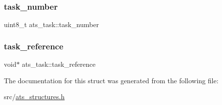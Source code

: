 \subsubsection{\texorpdfstring{task\+\_\+number}{task\_number}}
{\footnotesize\ttfamily uint8\+\_\+t ats\+\_\+task\+::task\+\_\+number}

\mbox{\label{structats__task_a058f0acf4bc87250302ff718710d5dbf}} 
\subsubsection{\texorpdfstring{task\+\_\+reference}{task\_reference}}
{\footnotesize\ttfamily void$\ast$ ats\+\_\+task\+::task\+\_\+reference}



The documentation for this struct was generated from the following file\+:\begin{DoxyCompactItemize}
\item 
src/\hyperlink{ats__structures_8h}{ats\+\_\+structures.\+h}\end{DoxyCompactItemize}
